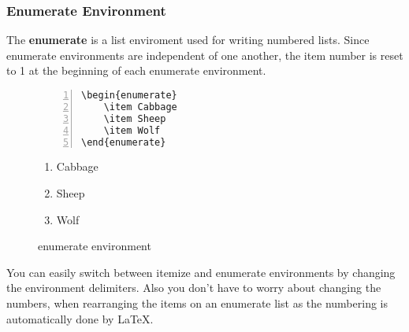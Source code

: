 \documentclass{article}
\begin{document}
\subsubsection{Enumerate Environment}
The \textbf{enumerate} is a list enviroment used for writing numbered lists. Since enumerate environments are independent of one another, the item number is reset to 1 at the beginning of each enumerate environment.
\begin{figure}[h]
\centering
\begin{minipage}{0.45\textwidth}
\begin{Verbatim}[numbers = left]
\begin{enumerate}
	\item Cabbage
	\item Sheep
	\item Wolf
\end{enumerate}
\end{Verbatim}
\end{minipage}
\begin{minipage}{0.45\textwidth}
\begin{enumerate}
	\item Cabbage
	\item Sheep
	\item Wolf
\end{enumerate}
\end{minipage}
\caption{enumerate environment}
\end{figure}

You can easily switch between itemize and enumerate environments by changing the environment delimiters. Also you don't have to worry about changing the numbers, when rearranging the items on an enumerate list as the numbering is automatically done by \LaTeX{}.
\end{document}
